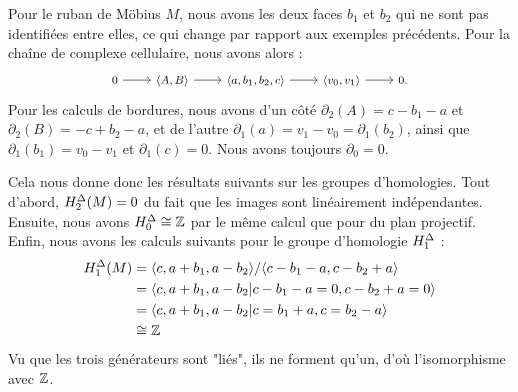 \phantom{}

\begin{exemple}
Pour le ruban de Möbius $M$, nous avons les deux faces $b_1$ et $b_2$ qui ne sont pas identifiées entre elles, ce qui change par rapport aux exemples précédents. Pour la chaîne de complexe cellulaire, nous avons alors : \[\footnotesize
\begin{tikzcd}
0\arrow[r]&\langle A,B\rangle\arrow[r]&\langle a,b_1,b_2,c\rangle\arrow[r]&\langle v_0, v_1\rangle\arrow[r]&0.
\end{tikzcd}
\]Pour les calculs de bordures, nous avons d'un côté $\partial_2(A)=c-b_1-a$ et~$\partial_2(B)=-c+b_2-a$, et de l'autre $\partial_1(a)=v_1-v_0=\partial_1(b_2)$, ainsi que~$\partial_1(b_1)=v_0-v_1$ et $\partial_1(c)=0$. Nous avons toujours $\partial_0=0$.

Cela nous donne donc les résultats suivants sur les groupes d'homologies. Tout d'abord, $H^\Delta_2(M)=0$ du fait que les images sont linéairement indépendantes. Ensuite, nous avons $H^\Delta_0\cong\mathbb{Z}$ par le même calcul que pour du plan projectif. Enfin, nous avons les calculs suivants pour le groupe d'homologie $H^\Delta_1$ : \[\begin{split}
H^\Delta_1(M)&=\langle c,a+b_1,a-b_2\rangle/\langle c-b_1-a,c-b_2+a\rangle\\
&=\langle c,a+b_1,a-b_2|c-b_1-a=0,c-b_2+a=0\rangle\\
&=\langle c,a+b_1,a-b_2|c=b_1+a,c=b_2-a\rangle\\
&\cong \mathbb{Z}
\end{split}\]Vu que les trois générateurs sont "liés", ils ne forment qu'un, d'où l'isomorphisme avec $\mathbb{Z}$.
\end{exemple}

\newpage
